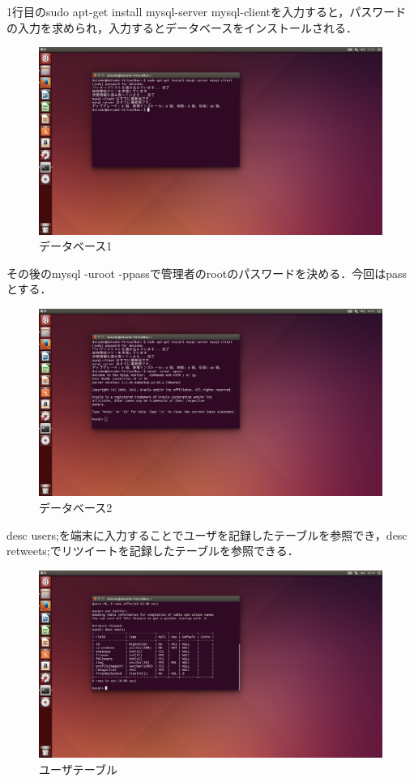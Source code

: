 1行目のsudo apt-get install mysql-server mysql-clientを入力すると，パスワードの入力を求められ，入力するとデータベースをインストールされる．

\begin{figure}[H]
\centering
\includegraphics[width=15cm]{database001.png}
\caption{データベース1}\label{データベース001の画像}
\end{figure}

その後のmysql -uroot -ppassで管理者のrootのパスワードを決める．今回はpassとする．

\begin{figure}[H]
\centering
\includegraphics[width=15cm]{database002.png}
\caption{データベース2}\label{データベース002の画像}
\end{figure}

desc users;を端末に入力することでユーザを記録したテーブルを参照でき，desc retweets;でリツイートを記録したテーブルを参照できる．

\begin{figure}[H]
\centering
\includegraphics[width=15cm]{database003.png}
\caption{ユーザテーブル}\label{データベース003の画像}
\end{figure}


